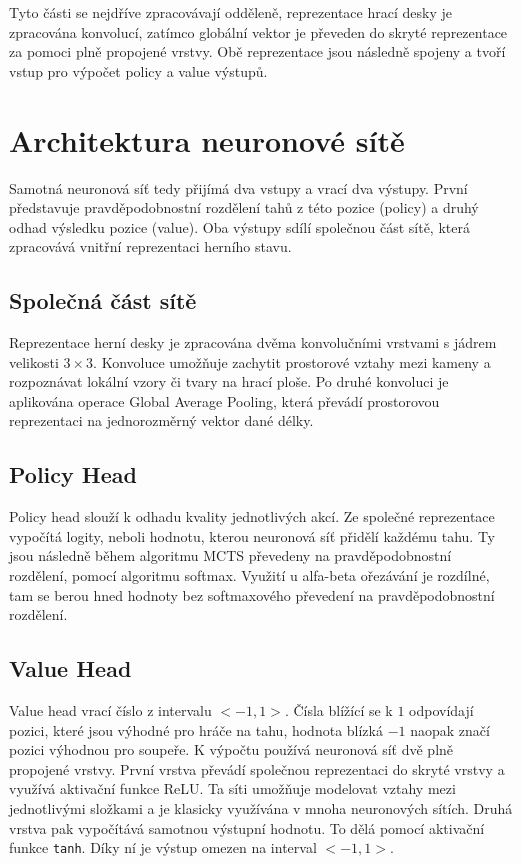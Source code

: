 Tyto části se nejdříve zpracovávají odděleně, reprezentace hrací desky je zpracována konvolucí, zatímco globální vektor je převeden do skryté reprezentace
za pomoci plně propojené vrstvy. Obě reprezentace jsou následně spojeny a tvoří vstup pro výpočet policy a value výstupů.


\section{Architektura neuronové sítě}

Samotná neuronová síť tedy přijímá dva vstupy a vrací dva výstupy. První představuje pravděpodobnostní rozdělení tahů z této pozice (policy) a druhý
odhad výsledku pozice (value). Oba výstupy sdílí společnou část sítě, která zpracovává  vnitřní reprezentaci herního stavu.

\subsection{Společná část sítě}

Reprezentace herní desky je zpracována dvěma konvolučními vrstvami s jádrem velikosti $3 \times 3$. Konvoluce umožňuje zachytit prostorové vztahy
mezi kameny a rozpoznávat lokální vzory či tvary na hrací ploše. Po druhé konvoluci je aplikována operace Global Average Pooling, která převádí 
prostorovou reprezentaci na jednorozměrný vektor dané délky.

\subsection{Policy Head}

Policy head slouží k odhadu kvality jednotlivých akcí. Ze společné reprezentace vypočítá logity, neboli hodnotu, kterou neuronová síť přidělí každému tahu.
Ty jsou následně během algoritmu MCTS převedeny na pravděpodobnostní rozdělení, pomocí algoritmu softmax. Využití u alfa-beta ořezávání je rozdílné,
tam se berou hned hodnoty bez softmaxového převedení na pravděpodobnostní rozdělení.

\subsection{Value Head}

Value head vrací číslo z intervalu $<-1,1>$. Čísla blížící se k $1$ odpovídají pozici, které jsou výhodné pro hráče na tahu, hodnota blízká $-1$ naopak 
značí pozici výhodnou pro soupeře. K výpočtu používá neuronová síť dvě plně propojené vrstvy. První vrstva převádí společnou reprezentaci do skryté vrstvy
a využívá aktivační funkce ReLU. Ta síti umožňuje modelovat vztahy mezi jednotlivými složkami a je klasicky využívána v mnoha neuronových sítích. 
Druhá vrstva pak vypočítává samotnou výstupní hodnotu. To dělá pomocí aktivační funkce \texttt{tanh}. Díky ní je výstup omezen na interval $<-1,1>$.

